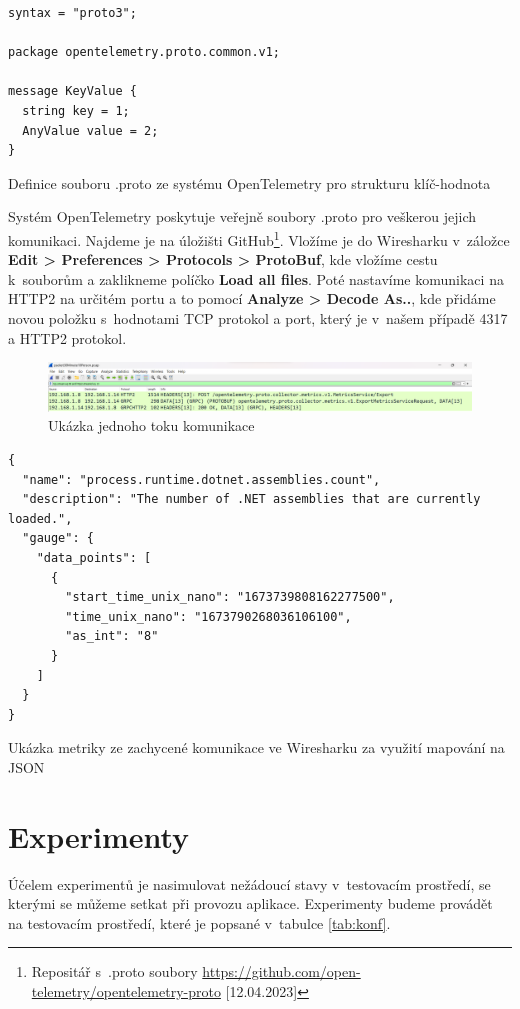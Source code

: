 \begin{listing}[H]
    \begin{verbatim}
syntax = "proto3";

package opentelemetry.proto.common.v1;

message KeyValue {
  string key = 1;
  AnyValue value = 2;
}
\end{verbatim}
    \caption{Definice souboru .proto ze systému OpenTelemetry pro strukturu klíč-hodnota}
    \label{lst:proto}
\end{listing}

Systém OpenTelemetry poskytuje veřejně soubory .proto pro veškerou jejich komunikaci. Najdeme je na úložišti GitHub\footnote{Repositář s~.proto soubory \url{https://github.com/open-telemetry/opentelemetry-proto} [12.04.2023]}. Vložíme je do Wiresharku v~záložce \textbf{Edit > Preferences > Protocols > ProtoBuf}, kde vložíme cestu k~souborům a zaklikneme políčko \textbf{Load all files}. Poté nastavíme komunikaci na HTTP2 na určitém portu a to pomocí \textbf{Analyze > Decode As..}, kde přidáme novou položku s~hodnotami TCP protokol a port, který je v~našem případě 4317 a HTTP2 protokol.

\begin{figure}[H]
  \centering
  \includegraphics[width=15cm]{obrazky-figures/wireshark.png}
  \caption{Ukázka jednoho toku komunikace}
  \label{fig:wireshark}
\end{figure}

\begin{listing}[H]
    \begin{verbatim}
{
  "name": "process.runtime.dotnet.assemblies.count",
  "description": "The number of .NET assemblies that are currently loaded.",
  "gauge": {
    "data_points": [
      {
        "start_time_unix_nano": "1673739808162277500",
        "time_unix_nano": "1673790268036106100",
        "as_int": "8"
      }
    ]
  }
}
\end{verbatim}
    \caption{Ukázka metriky ze zachycené komunikace ve Wiresharku za využití mapování na JSON}
    \label{lst:protoMetrika}
\end{listing}


\section{Experimenty}
Účelem experimentů je nasimulovat nežádoucí stavy v~testovacím prostředí, se kterými se můžeme setkat při provozu aplikace. Experimenty budeme provádět na testovacím prostředí, které je popsané v~tabulce \ref{tab:konf}.

